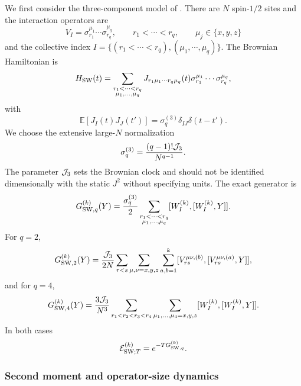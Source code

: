 \documentclass{article}
\theoremstyle{definition}
\begin{document}
We first consider the three-component model of \cite{swingle2024bosonic}.  There
are $N$ spin-$1/2$ sites and the interaction operators are
\begin{equation}
    V_I=\sigma_{r_1}^{\mu_1}\cdots\sigma_{r_q}^{\mu_q},
    \qquad
    r_1<\cdots<r_q,
    \qquad
    \mu_j\in\{x,y,z\}
\end{equation}
and the collective index $I=\{(r_1<\cdots <r_q), (\mu_1,\cdots, \mu_q)\}$.
The Brownian Hamiltonian is
\begin{equation}
    H_{\rm SW}(t)
    =\sum_{\substack{r_1<\cdots<r_q\\
                    \mu_1,\ldots,\mu_q}}
    J_{r_1\mu_1\cdots r_q\mu_q}(t)
    \sigma_{r_1}^{\mu_1}\cdots\sigma_{r_q}^{\mu_q},
\end{equation}
with
\begin{equation}
    \mathbb E[J_I(t)J_J(t')]
    =\sigma_q^{(3)}\delta_{IJ}\delta(t-t').
\end{equation}
We choose the extensive large-$N$ normalization
\begin{equation}
    \sigma_q^{(3)}
    =\frac{(q-1)!{\cal J}_3}{N^{q-1}}.
\end{equation}
The parameter ${\cal J}_3$ sets the Brownian clock and should not be
identified dimensionally with the static $J^2$ without specifying units.
The exact generator is
\begin{equation}
    G_{{\rm SW},q}^{(k)}(Y)
    =\frac{\sigma_q^{(3)}}{2}
    \sum_{\substack{r_1<\cdots<r_q\\
                    \mu_1,\ldots,\mu_q}}
    [W_I^{(k)},[W_I^{(k)},Y]].
\end{equation}
For $q=2$,
\begin{equation}
    G_{{\rm SW},2}^{(k)}(Y)
    =\frac{{\cal J}_3}{2N}
    \sum_{r<s}\sum_{\mu,\nu=x,y,z}\sum_{a,b=1}^k
    [V_{rs}^{\mu\nu,(b)},[V_{rs}^{\mu\nu,(a)},Y]],
\end{equation}
and for $q=4$,
\begin{equation}
    G_{{\rm SW},4}^{(k)}(Y)
    =\frac{3{\cal J}_3}{N^3}
    \sum_{r_1<r_2<r_3<r_4}
    \sum_{\mu_1,\ldots,\mu_4=x,y,z}
    [W_I^{(k)},[W_I^{(k)},Y]].
\end{equation}
In both cases
\begin{equation}
    {\cal E}_{{\rm SW};T}^{(k)}
    =e^{-TG_{{\rm SW},q}^{(k)}}.
\end{equation}

\subsubsection{Second moment and operator-size dynamics}
\end{document}
